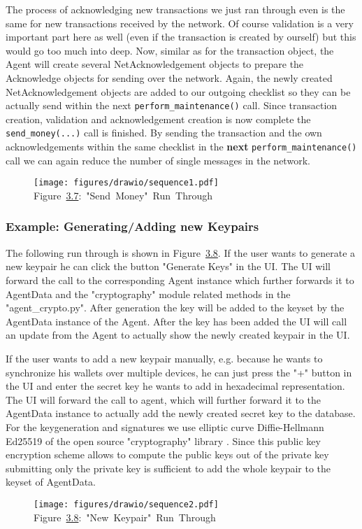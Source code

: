 The process of acknowledging new transactions we just ran through even is the same for new transactions received by the network. Of course validation is a very important part here as well (even if the transaction is created by ourself) but this would go too much into deep.
Now, similar as for the transaction object, the Agent will create several NetAcknowledgement objects to prepare the Acknowledge objects for sending over the network.
Again, the newly created NetAcknowledgement objects are added to our outgoing checklist so they can be actually send within the next \texttt{perform\_maintenance()} call.
Since transaction creation, validation and acknowledgement creation is now complete the \texttt{send\_money(...)} call is finished.
By sending the transaction and the own acknowledgements within the same checklist in the \textbf{next} \texttt{perform\_maintenance()} call we can again reduce the number of single messages in the network.


\begin{figure}[h]
	\centering
	\texttt{[image: figures/drawio/sequence1.pdf]}
	\footnotesize{Figure~\hyperref[send_money]{3.7}:~"Send~Money"~Run~Through}
    \label{send_money}
\end{figure}

\subsubsection{Example: Generating/Adding new Keypairs}
The following run through is shown in Figure~\hyperref[sequence2]{3.8}.
If the user wants to generate a new keypair he can click the button "Generate Keys" in the UI.
The UI will forward the call to the corresponding Agent instance which further forwards it to AgentData and the "cryptography" module \cite{pypi_crypt} related methods in the "agent\_crypto.py".
After generation the key will be added to the keyset by the AgentData instance of the Agent.
After the key has been added the UI will call an update from the Agent to actually show the newly created keypair in the UI.

If the user wants to add a new keypair manually, e.g. because he wants to synchronize his wallets over multiple devices, he can just press the "+" button in the UI and enter the secret key he wants to add in hexadecimal representation.
The UI will forward the call to agent, which will further forward it to the AgentData instance to actually add the newly created secret key to the database.
For the keygeneration and signatures we use elliptic curve Diffie-Hellmann Ed25519 of the open source "cryptography" library \cite{pypi_crypt}.
Since this public key encryption scheme allows to compute the public keys out of the private key submitting only the private key is sufficient to add the whole keypair to the keyset of AgentData.


\begin{figure}[h]
	\centering
	\texttt{[image: figures/drawio/sequence2.pdf]}
	\footnotesize{Figure~\hyperref[sequence2]{3.8}:~"New~Keypair"~Run~Through}
	\label{sequence2}
\end{figure}